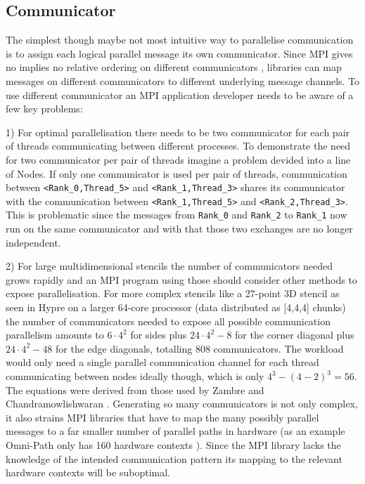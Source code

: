 \documentclass[sigconf]{acmart}
\begin{document}
\subsection{Communicator}

The simplest though maybe not most intuitive way to parallelise communication is to assign each logical parallel message its own communicator.
Since MPI gives no implies no relative ordering on different communicators \cite{zambreLessonsLearned2022}, libraries can map messages on different communicators to different underlying message channels.
To use different communicator an MPI application developer needs to be aware of a few key problems:

1) For optimal parallelisation there needs to be two communicator for each pair of threads communicating between different processes.
To demonstrate the need for two communicator per pair of threads imagine a problem devided into a line of Nodes.
If only one communicator is used per pair of threads, communication between \verb|<Rank_0,Thread_5>| and \verb|<Rank_1,Thread_3>| shares its communicator with the communication between \verb|<Rank_1,Thread_5>| and \verb|<Rank_2,Thread_3>|.
This is problematic since the messages from \verb|Rank_0| and \verb|Rank_2| to \verb|Rank_1| now run on the same communicator and with that those two exchanges are no longer independent.

2) For large multidimensional stencils the number of communicators needed grows rapidly and an MPI program using those should consider other methods to expose parallelisation.
For more complex stencils like a 27-point 3D stencil as seen in Hypre\cite{hypre2020} on a larger 64-core processor (data distributed as [4,4,4] chunks) the number of communicators needed to expose all possible communication parallelism amounts to $6 \cdot 4^2$ for sides plus $24 \cdot 4^2 - 8$ for the corner diagonal plus $24 \cdot 4^2 - 48$ for the edge diagonals, totalling $808$ communicators.
The workload would only need a single parallel communication channel for each thread communicating between nodes ideally though, which is only $4^3 - (4-2)^3 = 56$.
The equations were derived from those used by Zambre and Chandramowlishwaran \cite{zambreLessonsLearned2022}.
Generating so many communicators is not only complex, it also strains MPI libraries that have to map the many possibly parallel messages to a far smaller number of parallel paths in hardware (as an example Omni-Path only has 160 hardware contexts \cite{intelOmniPath}).
Since the MPI library lacks the knowledge of the intended communication pattern its mapping to the relevant hardware contexts will be suboptimal.
\end{document}
